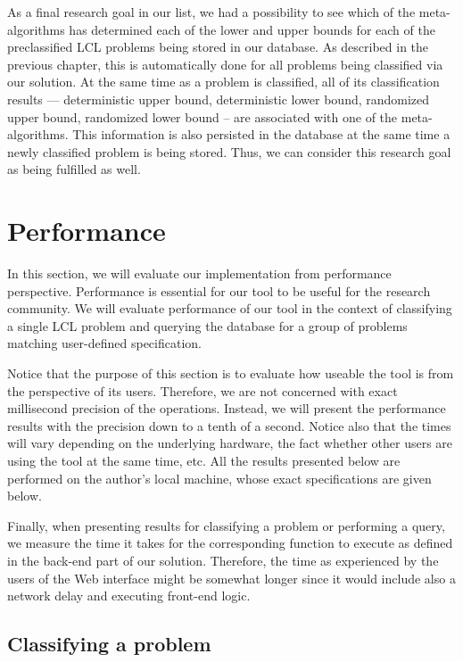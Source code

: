 As a final research goal in our list, we had a possibility
to see which of the meta-algorithms has determined each
of the lower and upper bounds for each of the preclassified
LCL problems being stored in our database. As described in the
previous chapter, this is automatically done for all problems being
classified via our solution. At the same time as a problem is classified,
all of its classification results --- deterministic upper bound,
deterministic lower bound, randomized upper bound, randomized lower bound --
are associated with one of the meta-algorithms. This information is also
persisted in the database at the same time a newly classified problem
is being stored. Thus, we can consider this research goal as being
fulfilled as well.

\section{Performance}

In this section, we will evaluate our implementation from
performance perspective. Performance is essential for
our tool to be useful for the research community.
We will evaluate performance of our tool
in the context of classifying a single LCL problem and
querying the database for a group
of problems matching user-defined specification.

Notice that the purpose of this section is to evaluate how
useable the tool is from the perspective of its users.
Therefore, we are not concerned with exact millisecond
precision of the operations. Instead, we will present
the performance results with the precision down to a tenth of a second.
Notice also that the times will vary depending on the underlying
hardware, the fact whether other users are using the tool at the same
time, etc. All the results presented below are performed on the
author's local machine, whose exact specifications are given below.

Finally, when presenting results for classifying a problem or
performing a query, we measure the time it takes
for the corresponding function to execute as defined in the back-end
part of our solution. Therefore, the time as experienced by the users of
the Web interface might be somewhat longer since it would include
also a network delay and executing front-end logic.

\subsection{Classifying a problem}

